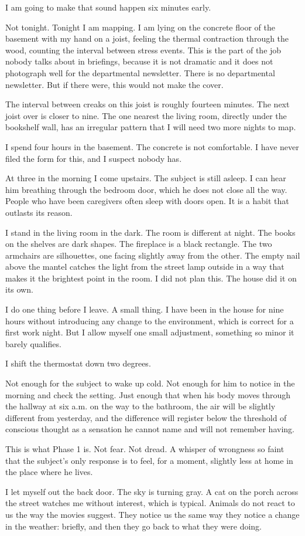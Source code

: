 I am going to make that sound happen six minutes early.

Not tonight. Tonight I am mapping. I am lying on the concrete floor of the basement with my hand on a joist, feeling the thermal contraction through the wood, counting the interval between stress events. This is the part of the job nobody talks about in briefings, because it is not dramatic and it does not photograph well for the departmental newsletter. There is no departmental newsletter. But if there were, this would not make the cover.

The interval between creaks on this joist is roughly fourteen minutes. The next joist over is closer to nine. The one nearest the living room, directly under the bookshelf wall, has an irregular pattern that I will need two more nights to map.

I spend four hours in the basement. The concrete is not comfortable. I have never filed the form for this, and I suspect nobody has.

At three in the morning I come upstairs. The subject is still asleep. I can hear him breathing through the bedroom door, which he does not close all the way. People who have been caregivers often sleep with doors open. It is a habit that outlasts its reason.

I stand in the living room in the dark. The room is different at night. The books on the shelves are dark shapes. The fireplace is a black rectangle. The two armchairs are silhouettes, one facing slightly away from the other. The empty nail above the mantel catches the light from the street lamp outside in a way that makes it the brightest point in the room. I did not plan this. The house did it on its own.

I do one thing before I leave. A small thing. I have been in the house for nine hours without introducing any change to the environment, which is correct for a first work night. But I allow myself one small adjustment, something so minor it barely qualifies.

I shift the thermostat down two degrees.

Not enough for the subject to wake up cold. Not enough for him to notice in the morning and check the setting. Just enough that when his body moves through the hallway at six a.m. on the way to the bathroom, the air will be slightly different from yesterday, and the difference will register below the threshold of conscious thought as a sensation he cannot name and will not remember having.

This is what Phase 1 is. Not fear. Not dread. A whisper of wrongness so faint that the subject's only response is to feel, for a moment, slightly less at home in the place where he lives.

I let myself out the back door. The sky is turning gray. A cat on the porch across the street watches me without interest, which is typical. Animals do not react to us the way the movies suggest. They notice us the same way they notice a change in the weather: briefly, and then they go back to what they were doing.
